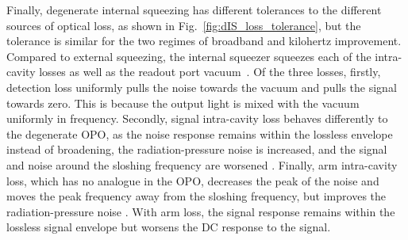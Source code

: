 Finally, degenerate internal squeezing has different tolerances to the different sources of optical loss, as shown in Fig.~\ref{fig:dIS_loss_tolerance}, but the tolerance is similar for the two regimes of broadband and kilohertz improvement. %
Compared to external squeezing, the internal squeezer squeezes each of the intra-cavity losses as well as the readout port vacuum~\cite{}. %
Of the three losses, firstly, detection loss uniformly pulls the noise towards the vacuum and pulls the signal towards zero. This is because the output light is mixed with the vacuum uniformly in frequency. Secondly, signal intra-cavity loss behaves differently to the degenerate OPO, as the noise response remains within the lossless envelope instead of broadening, the radiation-pressure noise is increased, and the signal and noise around the sloshing frequency are worsened . Finally, arm intra-cavity loss, which has no analogue in the OPO, decreases the peak of the noise and moves the peak frequency away from the sloshing frequency, but improves the radiation-pressure noise . With arm loss, the signal response remains within the lossless signal envelope but worsens the DC response to the signal. 

